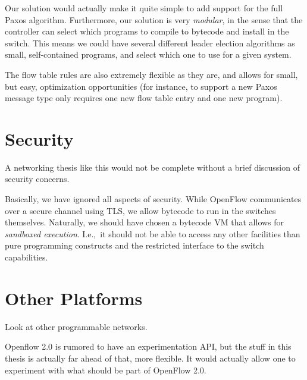 Our solution would actually make it quite simple to add support for the full
Paxos algorithm.  Furthermore, our solution is very \textit{modular}, in the
sense that the controller can select which programs to compile to bytecode
and install in the switch.  This means we could have several different
leader election algorithms as small, self-contained programs, and select
which one to use for a given system.

The flow table rules are also extremely flexible as they are, and allows for
small, but easy, optimization opportunities (for instance, to support a new
Paxos message type only requires one new flow table entry and one new
program).


\section{Security}

A networking thesis like this would not be complete without a brief
discussion of security concerns.

Basically, we have ignored all aspects of security.  While OpenFlow
communicates over a secure channel using \ac{TLS}, we
allow bytecode to run in the switches themselves.  Naturally, we should have
chosen a bytecode \acs{VM} that allows for \textit{sandboxed execution}.
I.e.,~it should not be able to access any other facilities than pure
programming constructs and the restricted interface to the switch
capabilities.



\section{Other Platforms}

Look at other programmable networks.

Openflow 2.0 is rumored to have an experimentation API, but the stuff in
this thesis is actually far ahead of that, more flexible.
It would actually allow one to experiment with what should be part of
OpenFlow 2.0.
